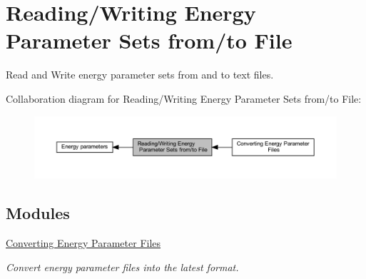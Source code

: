 \hypertarget{group__energy__parameters__rw}{}\section{Reading/\+Writing Energy Parameter Sets from/to File}
\label{group__energy__parameters__rw}


Read and Write energy parameter sets from and to text files.  


Collaboration diagram for Reading/\+Writing Energy Parameter Sets from/to File\+:
\nopagebreak
\begin{figure}[H]
\begin{center}
\leavevmode
\includegraphics[width=350pt]{group__energy__parameters__rw}
\end{center}
\end{figure}
\subsection*{Modules}
\begin{DoxyCompactItemize}
\item 
\hyperlink{group__energy__parameters__convert}{Converting Energy Parameter Files}
\begin{DoxyCompactList}\small\item\em Convert energy parameter files into the latest format. \end{DoxyCompactList}\end{DoxyCompactItemize}
